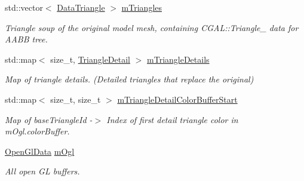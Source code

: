 \begin{DoxyCompactItemize}
\item 
\mbox{\label{classpepr3d_1_1_geometry_ae72aa9945025d6609ef0fe5beab238f9}} 
std\+::vector$<$ \mbox{\hyperlink{classpepr3d_1_1_data_triangle}{Data\+Triangle}} $>$ \mbox{\hyperlink{classpepr3d_1_1_geometry_ae72aa9945025d6609ef0fe5beab238f9}{m\+Triangles}}
\begin{DoxyCompactList}\small\item\em Triangle soup of the original model mesh, containing C\+G\+A\+L\+::\+Triangle\+\_ data for A\+A\+BB tree. \end{DoxyCompactList}\item 
\mbox{\label{classpepr3d_1_1_geometry_a899b65a3e64dc086f6275e4a5b616b62}} 
std\+::map$<$ size\+\_\+t, \mbox{\hyperlink{classpepr3d_1_1_triangle_detail}{Triangle\+Detail}} $>$ \mbox{\hyperlink{classpepr3d_1_1_geometry_a899b65a3e64dc086f6275e4a5b616b62}{m\+Triangle\+Details}}
\begin{DoxyCompactList}\small\item\em Map of triangle details. (Detailed triangles that replace the original) \end{DoxyCompactList}\item 
\mbox{\label{classpepr3d_1_1_geometry_aee03bb37cbf326e4594b58edacbc17c0}} 
std\+::map$<$ size\+\_\+t, size\+\_\+t $>$ \mbox{\hyperlink{classpepr3d_1_1_geometry_aee03bb37cbf326e4594b58edacbc17c0}{m\+Triangle\+Detail\+Color\+Buffer\+Start}}
\begin{DoxyCompactList}\small\item\em Map of base\+Triangle\+Id -\/$>$ Index of first detail triangle color in m\+Ogl.\+color\+Buffer. \end{DoxyCompactList}\item 
\mbox{\label{classpepr3d_1_1_geometry_addf4b4de09e100d6e4279d21e01a05eb}} 
\mbox{\hyperlink{structpepr3d_1_1_geometry_1_1_open_gl_data}{Open\+Gl\+Data}} \mbox{\hyperlink{classpepr3d_1_1_geometry_addf4b4de09e100d6e4279d21e01a05eb}{m\+Ogl}}
\begin{DoxyCompactList}\small\item\em All open GL buffers. \end{DoxyCompactList}\item 

\end{DoxyCompactItemize}
